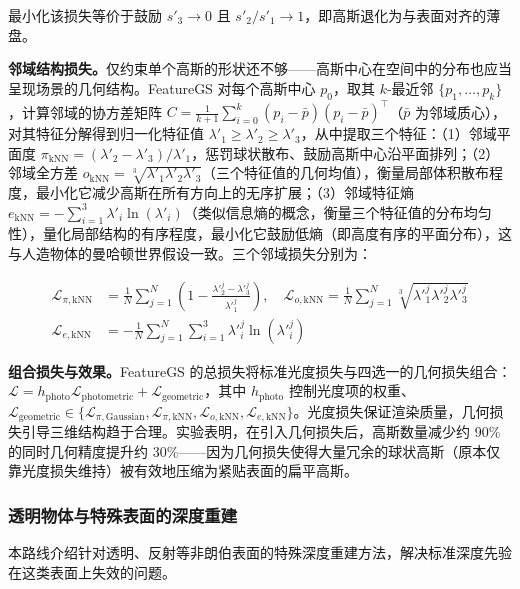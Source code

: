 最小化该损失等价于鼓励 $s'_3 \to 0$ 且 $s'_2 / s'_1 \to 1$，即高斯退化为与表面对齐的薄盘。

\textbf{邻域结构损失。}仅约束单个高斯的形状还不够——高斯中心在空间中的分布也应当呈现场景的几何结构。FeatureGS 对每个高斯中心 $p_0$，取其 $k$-最近邻 $\{p_1, \ldots, p_k\}$，计算邻域的协方差矩阵 $C = \frac{1}{k+1}\sum_{i=0}^{k}(p_i - \bar{p})(p_i - \bar{p})^\top$（$\bar{p}$ 为邻域质心），对其特征分解得到归一化特征值 $\lambda'_1 \geq \lambda'_2 \geq \lambda'_3$，从中提取三个特征：（1）邻域平面度 $\pi_{\text{kNN}} = (\lambda'_2 - \lambda'_3)/\lambda'_1$，惩罚球状散布、鼓励高斯中心沿平面排列；（2）邻域全方差 $o_{\text{kNN}} = \sqrt[3]{\lambda'_1 \lambda'_2 \lambda'_3}$（三个特征值的几何均值），衡量局部体积散布程度，最小化它减少高斯在所有方向上的无序扩展；（3）邻域特征熵 $e_{\text{kNN}} = -\sum_{i=1}^{3}\lambda'_i \ln(\lambda'_i)$（类似信息熵的概念，衡量三个特征值的分布均匀性），量化局部结构的有序程度，最小化它鼓励低熵（即高度有序的平面分布），这与人造物体的曼哈顿世界假设一致。三个邻域损失分别为：

\begin{align}
    \mathcal{L}_{\pi,\text{kNN}} &= \frac{1}{N}\sum_{j=1}^{N}\left(1 - \frac{\lambda'^{j}_2 - \lambda'^{j}_3}{\lambda'^{j}_1}\right), \quad
    \mathcal{L}_{o,\text{kNN}} = \frac{1}{N}\sum_{j=1}^{N}\sqrt[3]{\lambda'^{j}_1 \lambda'^{j}_2 \lambda'^{j}_3} \\
    \mathcal{L}_{e,\text{kNN}} &= -\frac{1}{N}\sum_{j=1}^{N}\sum_{i=1}^{3}\lambda'^{j}_i \ln(\lambda'^{j}_i)
\end{align}

\textbf{组合损失与效果。}FeatureGS 的总损失将标准光度损失与四选一的几何损失组合：$\mathcal{L} = h_{\text{photo}} \mathcal{L}_{\text{photometric}} + \mathcal{L}_{\text{geometric}}$，其中 $h_{\text{photo}}$ 控制光度项的权重、$\mathcal{L}_{\text{geometric}} \in \{\mathcal{L}_{\pi,\text{Gaussian}}, \mathcal{L}_{\pi,\text{kNN}}, \mathcal{L}_{o,\text{kNN}}, \mathcal{L}_{e,\text{kNN}}\}$。光度损失保证渲染质量，几何损失引导三维结构趋于合理。实验表明，在引入几何损失后，高斯数量减少约 90\% 的同时几何精度提升约 30\%——因为几何损失使得大量冗余的球状高斯（原本仅靠光度损失维持）被有效地压缩为紧贴表面的扁平高斯。

\subsubsection{透明物体与特殊表面的深度重建}
\label{subsec:04_1_5}

本路线介绍针对透明、反射等非朗伯表面的特殊深度重建方法，解决标准深度先验在这类表面上失效的问题。


